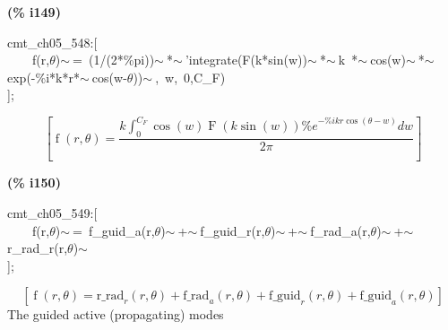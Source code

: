 \documentclass[fleqn]{article}
\begin{document}
\noindent
\begin{minipage}[t]{4.000000em}\color{red}\bfseries
(\% i149)	
\end{minipage}
\begin{minipage}[t]{\textwidth}\color{blue}
cmt\_ch05\_548:[\\
\ \ \ \ f(r,\ensuremath{\theta})\ensuremath{\sim\ }=\ (1/(2*\%pi))\ensuremath{\sim\ }*\ensuremath{\sim\ }'integrate(F(k*sin(w))\ensuremath{\sim\ }*\ensuremath{\sim\ }k\ *\ensuremath{\sim\ }cos(w)\ensuremath{\sim\ }*\ensuremath{\sim\ }exp(-\%i*k*r*\ensuremath{\sim\ }cos(w-\ensuremath{\theta}))\ensuremath{\sim\ },\ w,\ 0,C\_F)\\
];
\end{minipage}
\[\displaystyle \tag{\% o149} 
\left[ \operatorname{f}\left( r\operatorname{,}\theta \right) =\frac{k \int_{0}^{{C_F}}{\left. \cos{(w)} \operatorname{F}\left( k \sin{(w)}\right)  {{\% e}^{-\% i k r \cos{\left( \theta -w\right) }}}dw\right.}}{2 \ensuremath{\pi} }\right] \mbox{}
\]


\noindent
\begin{minipage}[t]{4.000000em}\color{red}\bfseries
(\% i150)	
\end{minipage}
\begin{minipage}[t]{\textwidth}\color{blue}
cmt\_ch05\_549:[\\
\ \ \ \ f(r,\ensuremath{\theta})\ensuremath{\sim\ }=\ f\_guid\_a(r,\ensuremath{\theta})\ensuremath{\sim\ }+\ensuremath{\sim\ }f\_guid\_r(r,\ensuremath{\theta})\ensuremath{\sim\ }+\ensuremath{\sim\ }f\_rad\_a(r,\ensuremath{\theta})\ensuremath{\sim\ }+\ensuremath{\sim\ }r\_rad\_r(r,\ensuremath{\theta})\ensuremath{\sim\ }\\
];
\end{minipage}
\[\displaystyle \tag{\% o150} 
\left[ \operatorname{f}\left( r\operatorname{,}\theta \right) ={{\ensuremath{\mathrm{r\_ rad}}}_r}\left( r\operatorname{,}\theta \right) +{{\ensuremath{\mathrm{f\_ rad}}}_a}\left( r\operatorname{,}\theta \right) +{{\ensuremath{\mathrm{f\_ guid}}}_r}\left( r\operatorname{,}\theta \right) +{{\ensuremath{\mathrm{f\_ guid}}}_a}\left( r\operatorname{,}\theta \right) \right] \mbox{}
\]
The guided active (propagating) modes
\end{document}
